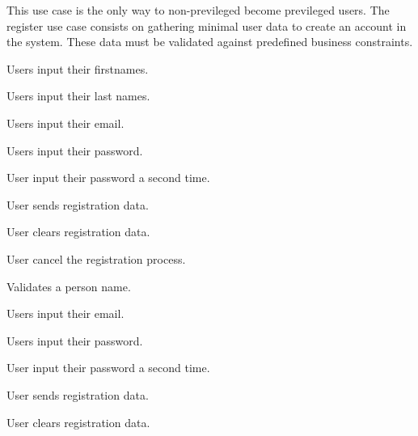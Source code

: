 \begin{use-case}[Register]
  This use case is the only way to non-previleged become previleged
  users. The register use case consists on gathering minimal user data
  to create an account in the system. These data must be validated
  against predefined business constraints.
  \begin{sub-use-case}
    \label{uc:add-first-name}
    Users input their firstnames.
  \end{sub-use-case}
  \begin{sub-use-case}
    \label{uc:add-last-name}
    Users input their last names.
  \end{sub-use-case}
%
  \begin{sub-use-case}
    \label{uc:add-email}
    Users input their email.
  \end{sub-use-case}
%
  \begin{sub-use-case}
    \label{uc:add-password}
    Users input their password.
  \end{sub-use-case}
%
  \begin{sub-use-case}
    \label{uc:repeat-password}
    User input their password a second time.
  \end{sub-use-case}
%
  \begin{sub-use-case}
    \label{uc:condirm-data}
    User sends registration data.
  \end{sub-use-case}
%
  \begin{sub-use-case}
    \label{uc:clear-data}
    User clears registration data.
  \end{sub-use-case}
%
  \begin{sub-use-case}[Cancel]
    \label{uc:cancel}
    User cancel the registration process.
  \end{sub-use-case}
%
  \begin{sub-use-case}
    \label{uc:add-first-name}
    Validates a person name.
  \end{sub-use-case}
%
  \begin{sub-use-case}
    \label{uc:add-email}
    Users input their email.
  \end{sub-use-case}
%
  \begin{sub-use-case}
    \label{uc:add-password}
    Users input their password.
  \end{sub-use-case}
%
  \begin{sub-use-case}
    \label{uc:repeat-password}
    User input their password a second time.
  \end{sub-use-case}
%
  \begin{sub-use-case}[Validate]
    \label{uc:condirm-data}
    User sends registration data.
  \end{sub-use-case}
%
  \begin{sub-use-case}
    \label{uc:clear-data}
    User clears registration data.
  \end{sub-use-case}
%

\end{use-case}
%

